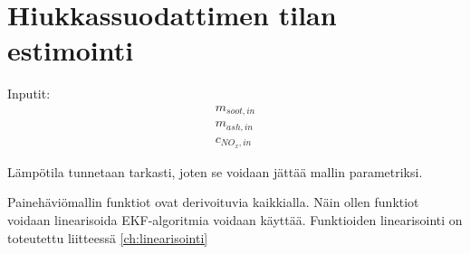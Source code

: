 \chapter{Hiukkassuodattimen tilan estimointi}%
\label{ch:dpf_estimointi}

Inputit:
\begin{align*}
    m_{soot, in}\\
    m_{ash, in}\\
    c_{NO_x, in}
\end{align*}

Lämpötila tunnetaan tarkasti, joten se voidaan jättää mallin parametriksi. 

Painehäviömallin funktiot ovat derivoituvia kaikkialla. Näin ollen funktiot voidaan linearisoida EKF-algoritmia voidaan käyttää. Funktioiden linearisointi on toteutettu liitteessä \ref{ch:linearisointi}